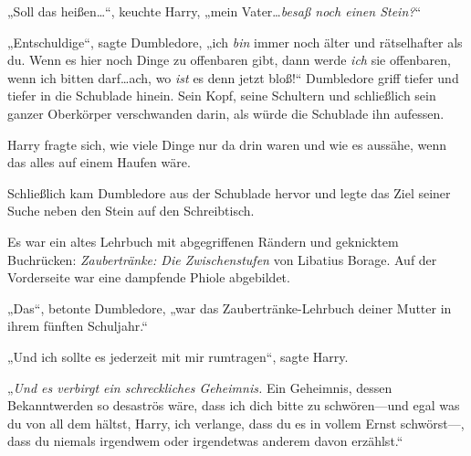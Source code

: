 „Soll das heißen…“, keuchte Harry, „mein Vater…\emph{besaß noch einen Stein?}“

„Entschuldige“, sagte Dumbledore, „ich \emph{bin} immer noch älter und rätselhafter als du. Wenn es hier noch Dinge zu offenbaren gibt, dann werde \emph{ich} sie offenbaren, wenn ich bitten darf…ach, wo \emph{ist} es denn jetzt bloß!“ Dumbledore griff tiefer und tiefer in die Schublade hinein. Sein Kopf, seine Schultern und schließlich sein ganzer Oberkörper verschwanden darin, als würde die Schublade ihn aufessen.

Harry fragte sich, wie viele Dinge nur da drin waren und wie es aussähe, wenn das alles auf einem Haufen wäre.

Schließlich kam Dumbledore aus der Schublade hervor und legte das Ziel seiner Suche neben den Stein auf den Schreibtisch.

Es war ein altes Lehrbuch mit abgegriffenen Rändern und geknicktem Buchrücken: \emph{Zaubertränke: Die Zwischenstufen} von Libatius Borage. Auf der Vorderseite war eine dampfende Phiole abgebildet.

„Das“, betonte Dumbledore, „war das Zaubertränke-Lehrbuch deiner Mutter in ihrem fünften Schuljahr.“

„Und ich sollte es jederzeit mit mir rumtragen“, sagte Harry.

„\emph{Und es verbirgt ein schreckliches Geheimnis.} Ein Geheimnis, dessen Bekanntwerden so desaströs wäre, dass ich dich bitte zu schwören—und egal was du von all dem hältst, Harry, ich verlange, dass du es in vollem Ernst schwörst—, dass du niemals irgendwem oder irgendetwas anderem davon erzählst.“

